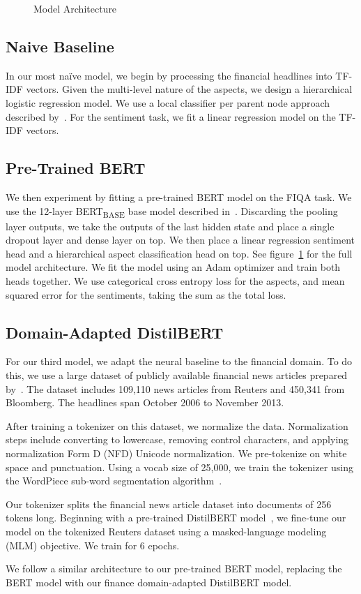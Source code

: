\begin{figure}
  \centering
  
  \caption{Model Architecture}  \label{fig:model}
\end{figure}

\subsection{Naive Baseline}

In our most naïve model, we begin by processing the financial headlines into TF-IDF vectors.
Given the multi-level nature of the aspects, we design a hierarchical logistic regression model.
We use a local classifier per parent node approach described by~\cite{Silla:2011tp}. For the sentiment task, we fit a linear regression model on the TF-IDF vectors.

\subsection{Pre-Trained BERT}

We then experiment by fitting a pre-trained BERT model on the FIQA task.
We use the 12-layer BERT\textsubscript{BASE} base model described in~\cite{DBLP:journals/corr/abs-1810-04805}.
Discarding the pooling layer outputs, we take the outputs of the last hidden state and place a single dropout layer and dense layer on top.
We then place a linear regression sentiment head and a hierarchical aspect classification head on top.
See figure~\ref{fig:model} for the full model architecture.
We fit the model using an Adam optimizer and train both heads together.
We use categorical cross entropy loss for the aspects, and mean squared error for the sentiments, taking the sum as the total loss.

\subsection{Domain-Adapted DistilBERT}

For our third model, we adapt the neural baseline to the financial domain.
To do this, we use a large dataset of publicly available financial news articles prepared by~\cite{ding2014using}.
The dataset includes 109,110 news articles from Reuters and 450,341 from Bloomberg.
The headlines span October 2006 to November 2013.

After training a tokenizer on this dataset, we normalize the data.
Normalization steps include converting to lowercase, removing control characters, and applying normalization Form D (NFD) Unicode normalization.
We pre-tokenize on white space and punctuation.
Using a vocab size of 25,000, we train the tokenizer using the WordPiece sub-word segmentation algorithm~\cite{DBLP:journals/corr/WuSCLNMKCGMKSJL16}.

Our tokenizer splits the financial news article dataset into documents of 256 tokens long.
Beginning with a pre-trained DistilBERT model~\citep{DBLP:journals/corr/abs-1910-01108}, we fine-tune our model on the tokenized Reuters dataset using a masked-language modeling (MLM) objective.
We train for 6 epochs.

We follow a similar architecture to our pre-trained BERT model, replacing the BERT model with our finance domain-adapted DistilBERT model.